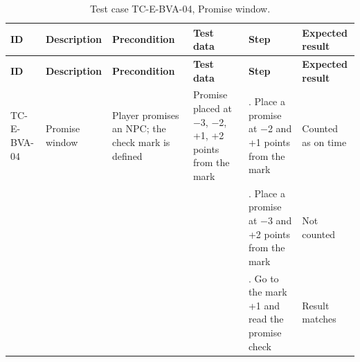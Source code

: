 {\footnotesize{}\renewcommand{\arraystretch}{1.1}
\begin{longtable}{|>{\raggedright\arraybackslash}p{}|>{\raggedright\arraybackslash}p{}|>{\raggedright\arraybackslash}p{}|>{\raggedright\arraybackslash}p{}|>{\raggedright\arraybackslash}p{}|>{\raggedright\arraybackslash}p{}|}
\caption{Test case TC-\allowbreak{}E-\allowbreak{}BVA-\allowbreak{}04, Promise window.} \\
\hline
\textbf{ID} & \textbf{Description} & \textbf{Precondition} & \textbf{Test data} & \textbf{Step} & \textbf{Expected result} \\ \hline
\endfirsthead
\hline
\textbf{ID} & \textbf{Description} & \textbf{Precondition} & \textbf{Test data} & \textbf{Step} & \textbf{Expected result} \\ \hline
\endhead
TC-E-BVA-04 & Promise window & Player promises an NPC; the check mark is defined & Promise placed at $-$3, $-$2, +1, +2 points from the mark & 1. Place a promise at $-$2 and +1 points from the mark & Counted as on time \\ \cline{5-6}
 &  &  &  & 2. Place a promise at $-$3 and +2 points from the mark & Not counted \\ \cline{5-6}
 &  &  &  & 3. Go to the mark +1 and read the promise check & Result matches \\ \hline
\end{longtable}
}

